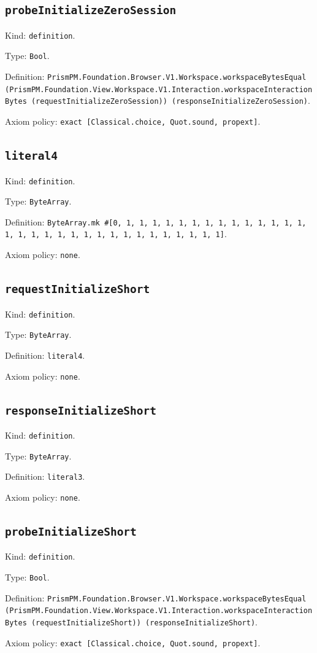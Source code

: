 \documentclass[11pt]{article}
\begin{document}
\subsection*{\texttt{probeInitializeZeroSession}}
\noindent Kind: \texttt{definition}.\par
\noindent Type: \texttt{Bool}.\par
\noindent Definition: \texttt{PrismPM.Foundation.Browser.V1.Workspace.workspaceBytesEqual (PrismPM.Foundation.View.Workspace.V1.Interaction.workspaceInteractionBytes (requestInitializeZeroSession)) (responseInitializeZeroSession)}.\par
\noindent Axiom policy: \texttt{exact [Classical.choice, Quot.sound, propext]}.\par
\subsection*{\texttt{literal4}}
\noindent Kind: \texttt{definition}.\par
\noindent Type: \texttt{ByteArray}.\par
\noindent Definition: \texttt{ByteArray.mk \#[0, 1, 1, 1, 1, 1, 1, 1, 1, 1, 1, 1, 1, 1, 1, 1, 1, 1, 1, 1, 1, 1, 1, 1, 1, 1, 1, 1, 1, 1, 1, 1]}.\par
\noindent Axiom policy: \texttt{none}.\par
\subsection*{\texttt{requestInitializeShort}}
\noindent Kind: \texttt{definition}.\par
\noindent Type: \texttt{ByteArray}.\par
\noindent Definition: \texttt{literal4}.\par
\noindent Axiom policy: \texttt{none}.\par
\subsection*{\texttt{responseInitializeShort}}
\noindent Kind: \texttt{definition}.\par
\noindent Type: \texttt{ByteArray}.\par
\noindent Definition: \texttt{literal3}.\par
\noindent Axiom policy: \texttt{none}.\par
\subsection*{\texttt{probeInitializeShort}}
\noindent Kind: \texttt{definition}.\par
\noindent Type: \texttt{Bool}.\par
\noindent Definition: \texttt{PrismPM.Foundation.Browser.V1.Workspace.workspaceBytesEqual (PrismPM.Foundation.View.Workspace.V1.Interaction.workspaceInteractionBytes (requestInitializeShort)) (responseInitializeShort)}.\par
\noindent Axiom policy: \texttt{exact [Classical.choice, Quot.sound, propext]}.\par
\end{document}
